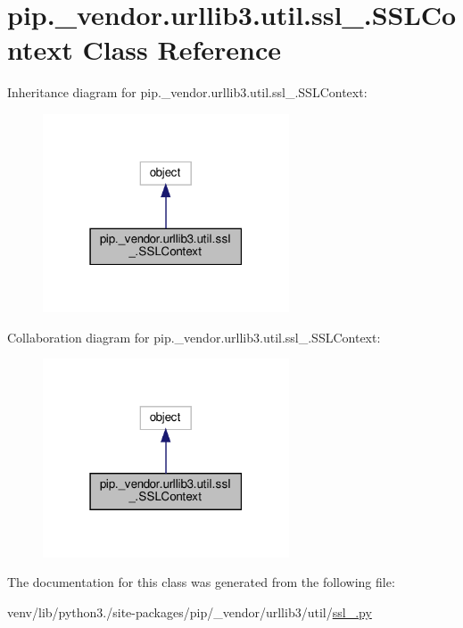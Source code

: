 \hypertarget{classpip_1_1__vendor_1_1urllib3_1_1util_1_1ssl___1_1SSLContext}{}\section{pip.\+\_\+vendor.\+urllib3.\+util.\+ssl\+\_\+.\+S\+S\+L\+Context Class Reference}
\label{classpip_1_1__vendor_1_1urllib3_1_1util_1_1ssl___1_1SSLContext}


Inheritance diagram for pip.\+\_\+vendor.\+urllib3.\+util.\+ssl\+\_\+.\+S\+S\+L\+Context\+:
\nopagebreak
\begin{figure}[H]
\begin{center}
\leavevmode
\includegraphics[width=207pt]{classpip_1_1__vendor_1_1urllib3_1_1util_1_1ssl___1_1SSLContext__inherit__graph}
\end{center}
\end{figure}


Collaboration diagram for pip.\+\_\+vendor.\+urllib3.\+util.\+ssl\+\_\+.\+S\+S\+L\+Context\+:
\nopagebreak
\begin{figure}[H]
\begin{center}
\leavevmode
\includegraphics[width=207pt]{classpip_1_1__vendor_1_1urllib3_1_1util_1_1ssl___1_1SSLContext__coll__graph}
\end{center}
\end{figure}


The documentation for this class was generated from the following file\+:\begin{DoxyCompactItemize}
\item 
venv/lib/python3./site-\/packages/pip/\+\_\+vendor/urllib3/util/\hyperlink{ssl___8py}{ssl\+\_\+.\+py}\end{DoxyCompactItemize}
